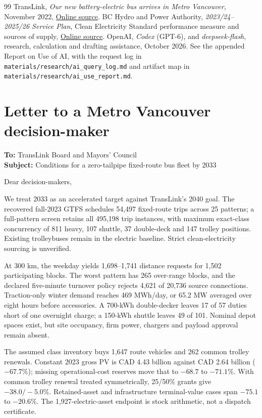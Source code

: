 \documentclass[12pt,letterpaper]{article}
\begin{document}
\begin{thebibliography}{99}
 TransLink, \emph{Our new battery-electric bus arrives in Metro Vancouver}, November 2022, \href{https://buzzer.translink.ca/2022/11/our-new-battery-electric-bus-arrives-in-metro-vancouver/}{Online source}.
 BC Hydro and Power Authority, \emph{2023/24--2025/26 Service Plan}, Clean Electricity Standard performance measure and sources of supply, \href{https://www.bcbudget.gov.bc.ca/2023/sp/pdf/agency/bchydro.pdf}{Online source}.
 OpenAI, \emph{Codex} (GPT-6), and \emph{deepseek-flash}, research, calculation and drafting assistance, October 2026. See the appended Report on Use of AI, with the request log in \nolinkurl{materials/research/ai_query_log.md} and artifact map in \nolinkurl{materials/research/ai_use_report.md}.
\end{thebibliography}

\newpage
{}
\section*{Letter to a Metro Vancouver decision-maker}
\textbf{To:} TransLink Board and Mayors' Council\\
\textbf{Subject:} Conditions for a zero-tailpipe fixed-route bus fleet by 2033

Dear decision-makers,

We treat 2033 as an accelerated target against TransLink's 2040 goal. The recovered fall-2023 GTFS schedules 54,497 fixed-route trips across 25 patterns; a full-pattern screen retains all 495,198 trip instances, with maximum exact-class concurrency of 811 heavy, 107 shuttle, 37 double-deck and 147 trolley positions. Existing trolleybuses remain in the electric baseline. Strict clean-electricity sourcing is unverified.

At 300 km, the weekday yields 1,698--1,741 distance requests for 1,502 participating blocks. The worst pattern has 265 over-range blocks, and the declared five-minute turnover policy rejects 4,621 of 20,736 source connections. Traction-only winter demand reaches 469 MWh/day, or 65.2 MW averaged over eight hours before accessories. A 700-kWh double-decker leaves 17 of 57 duties short of one overnight charge; a 150-kWh shuttle leaves 49 of 101. Nominal depot spaces exist, but site occupancy, firm power, chargers and payload approval remain absent.

The assumed class inventory buys 1,647 route vehicles and 262 common trolley renewals. Constant 2023 gross PV is CAD 4.43 billion against CAD 2.64 billion ($-67.7\%$); missing operational-cost reserves move that to $-68.7$ to $-71.1\%$. With common trolley renewal treated symmetrically, 25/50\% grants give $-38.0/-5.0\%$. Retained-asset and infrastructure terminal-value cases span $-75.1$ to $-20.6\%$. The 1,927-electric-asset endpoint is stock arithmetic, not a dispatch certificate.
\end{document}
